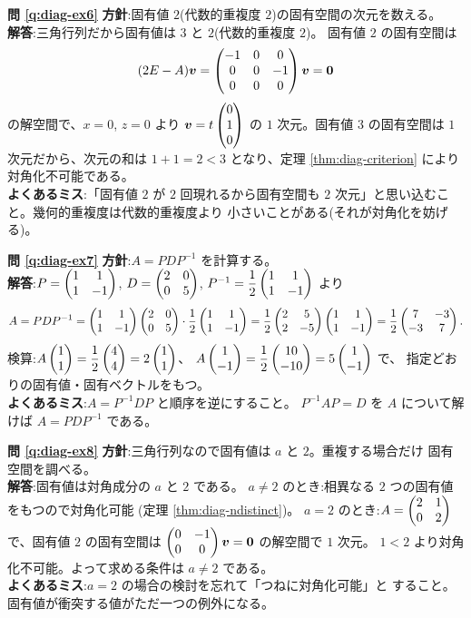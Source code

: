 \bigskip
\noindent\textbf{問 \ref{q:diag-ex6}}\quad
\textbf{方針}:固有値 $2$(代数的重複度 $2$)の固有空間の次元を数える。\\
\textbf{解答}:三角行列だから固有値は $3$ と $2$(代数的重複度 $2$)。
固有値 $2$ の固有空間は
\[
(2E - A)\bm{v} = \begin{pmatrix}-1 & 0 & 0 \\ 0 & 0 & -1 \\ 0 & 0 & 0\end{pmatrix}\bm{v}
= \bm{0}
\]
の解空間で、$x = 0$, $z = 0$ より $\bm{v} = t\begin{pmatrix}0 \\ 1 \\ 0\end{pmatrix}$ の
$1$ 次元。固有値 $3$ の固有空間は $1$ 次元だから、次元の和は
$1 + 1 = 2 < 3$ となり、定理 \ref{thm:diag-criterion} により
対角化不可能である。\\
\textbf{よくあるミス}:「固有値 $2$ が $2$ 回現れるから固有空間も
$2$ 次元」と思い込むこと。幾何的重複度は代数的重複度より
小さいことがある(それが対角化を妨げる)。

\bigskip
\noindent\textbf{問 \ref{q:diag-ex7}}\quad
\textbf{方針}:$A = PDP^{-1}$ を計算する。\\
\textbf{解答}:$P = \begin{pmatrix}1 & 1 \\ 1 & -1\end{pmatrix}$, $D = \begin{pmatrix}2 & 0 \\ 0 & 5\end{pmatrix}$,
$P^{-1} = \dfrac{1}{2}\begin{pmatrix}1 & 1 \\ 1 & -1\end{pmatrix}$ より
\[
A = PDP^{-1}
= \begin{pmatrix}1 & 1 \\ 1 & -1\end{pmatrix}\begin{pmatrix}2 & 0 \\ 0 & 5\end{pmatrix}\cdot\frac{1}{2}\begin{pmatrix}1 & 1 \\ 1 & -1\end{pmatrix}
= \frac{1}{2}\begin{pmatrix}2 & 5 \\ 2 & -5\end{pmatrix}\begin{pmatrix}1 & 1 \\ 1 & -1\end{pmatrix}
= \frac{1}{2}\begin{pmatrix}7 & -3 \\ -3 & 7\end{pmatrix}.
\]
検算:$A\begin{pmatrix}1 \\ 1\end{pmatrix} = \dfrac{1}{2}\begin{pmatrix}4 \\ 4\end{pmatrix} = 2\begin{pmatrix}1 \\ 1\end{pmatrix}$、
$A\begin{pmatrix}1 \\ -1\end{pmatrix} = \dfrac{1}{2}\begin{pmatrix}10 \\ -10\end{pmatrix} = 5\begin{pmatrix}1 \\ -1\end{pmatrix}$ で、
指定どおりの固有値・固有ベクトルをもつ。\\
\textbf{よくあるミス}:$A = P^{-1}DP$ と順序を逆にすること。
$P^{-1}AP = D$ を $A$ について解けば $A = PDP^{-1}$ である。

\bigskip
\noindent\textbf{問 \ref{q:diag-ex8}}\quad
\textbf{方針}:三角行列なので固有値は $a$ と $2$。重複する場合だけ
固有空間を調べる。\\
\textbf{解答}:固有値は対角成分の $a$ と $2$ である。
$a \neq 2$ のとき:相異なる $2$ つの固有値をもつので対角化可能
(定理 \ref{thm:diag-ndistinct})。
$a = 2$ のとき:$A = \begin{pmatrix}2 & 1 \\ 0 & 2\end{pmatrix}$ で、固有値 $2$ の固有空間は
$\begin{pmatrix}0 & -1 \\ 0 & 0\end{pmatrix}\bm{v} = \bm{0}$ の解空間で $1$ 次元。
$1 < 2$ より対角化不可能。よって求める条件は $a \neq 2$ である。\\
\textbf{よくあるミス}:$a = 2$ の場合の検討を忘れて「つねに対角化可能」と
すること。固有値が衝突する値がただ一つの例外になる。

